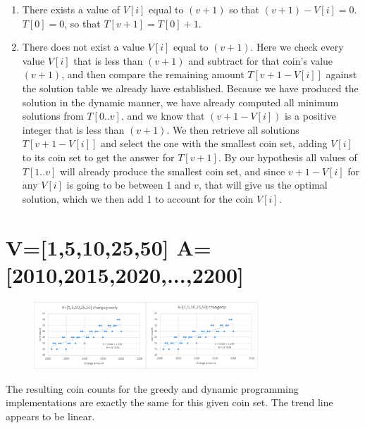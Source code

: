 \documentclass[letWterpaper,10pt,titlepage]{article}
\begin{document}
\begin{enumerate}
\item There exists a value of $V[i]$ equal to $(v+1)$ so that $(v+1)-V[i]=0$. $T[0] = 0$, so that $T[v+1]=T[0]+1$.

\item There does not exist a value $V[i]$ equal to $(v+1)$. Here we check every value $V[i]$ that is less than $(v+1)$ and subtract for that coin's value $(v+1)$, and then compare the remaining amount $T[v+1-V[i]]$ against the solution table we already have established. Because we have produced the solution in the dynamic manner, we have already computed all minimum solutions from $T[0..v]$. and we know that $(v+1-V[i])$ is a positive integer that is less than $(v+1)$. We then retrieve all solutions $T[v+1-V[i]]$ and select the one with the smallest coin set, adding $V[i]$ to its coin set to get the answer for $T[v+1]$. By our hypothesis all values of $T[1..v]$ will already produce the smallest coin set, and since $v+1-V[i]$ for any $V[i]$ is going to be between 1 and $v$, that will give us the optimal solution, which we then add 1 to account for the coin $V[i]$.
\end{enumerate}

\section{V=[1,5,10,25,50] A=[2010,2015,2020,...,2200]}
\begin{figure}[!h]
    \centering
    \includegraphics[width=0.75\textwidth]{./p4.eps}
\end{figure}
The resulting coin counts for the greedy and dynamic programming implementations are exactly the same for this given coin set. The trend line appears to be linear.
\end{document}
